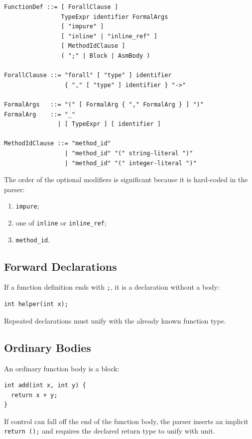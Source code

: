 \documentclass[12pt,oneside]{article}
\begin{document}
\begin{verbatim}
FunctionDef ::= [ ForallClause ]
                TypeExpr identifier FormalArgs
                [ "impure" ]
                [ "inline" | "inline_ref" ]
                [ MethodIdClause ]
                ( ";" | Block | AsmBody )

ForallClause ::= "forall" [ "type" ] identifier
                 { "," [ "type" ] identifier } "->"

FormalArgs   ::= "(" [ FormalArg { "," FormalArg } ] ")"
FormalArg    ::= "_"
               | [ TypeExpr ] [ identifier ]

MethodIdClause ::= "method_id"
                 | "method_id" "(" string-literal ")"
                 | "method_id" "(" integer-literal ")"
\end{verbatim}

The order of the optional modifiers is significant because it is hard-coded in
the parser:

\begin{enumerate}
\item \verb|impure|;
\item one of \verb|inline| or \verb|inline_ref|;
\item \verb|method_id|.
\end{enumerate}

\subsection{Forward Declarations}
If a function definition ends with \verb|;|, it is a declaration without a body:

\begin{verbatim}
int helper(int x);
\end{verbatim}

Repeated declarations must unify with the already known function type.

\subsection{Ordinary Bodies}
An ordinary function body is a block:

\begin{verbatim}
int add(int x, int y) {
  return x + y;
}
\end{verbatim}

If control can fall off the end of the function body, the parser inserts an
implicit \verb|return ();| and requires the declared return type to unify with
unit.
\end{document}
